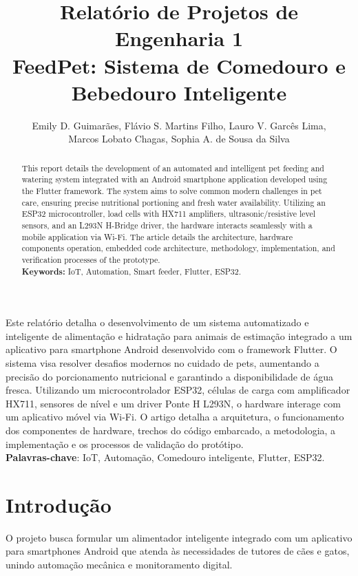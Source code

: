 \documentclass[12pt]{article}\usepackage{sbc-template}\usepackage{graphicx,url}\usepackage[utf8]{inputenc}
\title{Relatório de Projetos de Engenharia 1\\ FeedPet: Sistema de Comedouro e Bebedouro Inteligente}
\author{Emily D. Guimarães\inst{1}, Flávio S. Martins Filho\inst{1}, Lauro V. Garcês Lima\inst{1},\\
Marcos Lobato Chagas\inst{1}, Sophia A. de Sousa da Silva\inst{1}}
\begin{document}
 

\maketitle

\begin{abstract}
  This report details the development of an automated and intelligent pet feeding and watering system integrated with an Android smartphone application developed using the Flutter framework. The system aims to solve common modern challenges in pet care, ensuring precise nutritional portioning and fresh water availability. Utilizing an ESP32 microcontroller, load cells with HX711 amplifiers, ultrasonic/resistive level sensors, and an L293N H-Bridge driver, the hardware interacts seamlessly with a mobile application via Wi-Fi. The article details the architecture, hardware components operation, embedded code architecture, methodology, implementation, and verification processes of the prototype. \\
\textbf{Keywords:} IoT, Automation, Smart feeder, Flutter, ESP32.
\end{abstract}
     
\begin{resumo}
  Este relatório detalha o desenvolvimento de um sistema automatizado e inteligente de alimentação e hidratação para animais de estimação integrado a um aplicativo para smartphone Android desenvolvido com o framework Flutter. O sistema visa resolver desafios modernos no cuidado de pets, aumentando a precisão do porcionamento nutricional e garantindo a disponibilidade de água fresca. Utilizando um microcontrolador ESP32, células de carga com amplificador HX711, sensores de nível e um driver Ponte H L293N, o hardware interage com um aplicativo móvel via Wi-Fi. O artigo detalha a arquitetura, o funcionamento dos componentes de hardware, trechos do código embarcado, a metodologia, a implementação e os processos de validação do protótipo. \\
\textbf{Palavras-chave}: IoT, Automação, Comedouro inteligente, Flutter, ESP32.
\end{resumo}

\section{Introdução}

O projeto busca formular um alimentador inteligente integrado com um aplicativo para smartphones Android que atenda às necessidades de tutores de cães e gatos, unindo automação mecânica e monitoramento digital.
\end{document}
